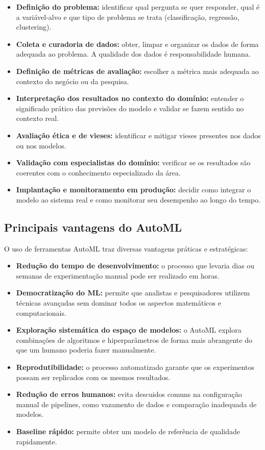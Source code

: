 \documentclass[11pt, a4paper, oneside]{article}
\begin{document}
\begin{itemize}[leftmargin=1.5cm, itemsep=4pt]
  \item \textbf{Definição do problema:} identificar qual pergunta se quer responder, qual é a variável-alvo e que tipo de problema se trata (classificação, regressão, clustering).
  \item \textbf{Coleta e curadoria de dados:} obter, limpar e organizar os dados de forma adequada ao problema. A qualidade dos dados é responsabilidade humana.
  \item \textbf{Definição de métricas de avaliação:} escolher a métrica mais adequada ao contexto do negócio ou da pesquisa.
  \item \textbf{Interpretação dos resultados no contexto do domínio:} entender o significado prático das previsões do modelo e validar se fazem sentido no contexto real.
  \item \textbf{Avaliação ética e de vieses:} identificar e mitigar vieses presentes nos dados ou nos modelos.
  \item \textbf{Validação com especialistas do domínio:} verificar se os resultados são coerentes com o conhecimento especializado da área.
  \item \textbf{Implantação e monitoramento em produção:} decidir como integrar o modelo ao sistema real e como monitorar seu desempenho ao longo do tempo.
\end{itemize}

\subsection{Principais vantagens do AutoML}
\label{sec:vantagens}

O uso de ferramentas AutoML traz diversas vantagens práticas e estratégicas:

\begin{itemize}[leftmargin=1.5cm, itemsep=4pt]
  \item \textbf{Redução do tempo de desenvolvimento:} o processo que levaria dias ou semanas de experimentação manual pode ser realizado em horas.
  \item \textbf{Democratização do ML:} permite que analistas e pesquisadores utilizem técnicas avançadas sem dominar todos os aspectos matemáticos e computacionais.
  \item \textbf{Exploração sistemática do espaço de modelos:} o AutoML explora combinações de algoritmos e hiperparâmetros de forma mais abrangente do que um humano poderia fazer manualmente.
  \item \textbf{Reprodutibilidade:} o processo automatizado garante que os experimentos possam ser replicados com os mesmos resultados.
  \item \textbf{Redução de erros humanos:} evita descuidos comuns na configuração manual de pipelines, como vazamento de dados e comparação inadequada de modelos.
  \item \textbf{Baseline rápido:} permite obter um modelo de referência de qualidade rapidamente.
\end{itemize}
\end{document}
